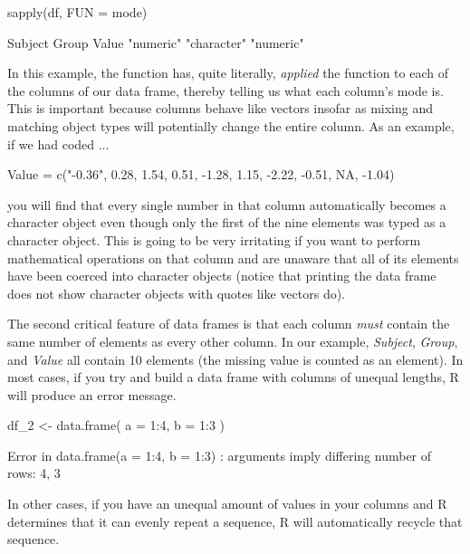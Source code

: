 \begin{inR}
sapply(df, FUN = mode) 
\end{inR}

\begin{outR}
     Subject       Group       Value 
  "numeric" "character"   "numeric"    
\end{outR}

In this example, the  function has, quite literally, \textit{applied} the function  to each of the columns of our data frame, thereby telling us what each column's mode is. This is important because columns behave like vectors insofar as mixing and matching object types will potentially change the entire column.  As an example, if we had coded ... 

\begin{inR}
Value = c("-0.36", 0.28, 1.54, 0.51, -1.28, 1.15, -2.22, -0.51, NA, -1.04)
\end{inR}

\vspace{1em}

\noindent
you will find that every single number in that column automatically becomes a character object even though only the first of the nine elements was typed as a character object. This is going to be very irritating if you want to perform mathematical operations on that column and are unaware that all of its elements have been coerced into character objects (notice that printing the data frame does not show character objects with quotes like vectors do).

The second critical feature of data frames is that each column \textit{must} contain the same number of elements as every other column.  In our example, \textit{Subject}, \textit{Group}, and \textit{Value} all contain 10 elements (the missing value is counted as an element).  In most cases, if you try and build a data frame with columns of unequal lengths, R will produce an error message. 

\begin{inR}
df_2 <- data.frame(
  a = 1:4,
  b = 1:3
)
\end{inR}
\begin{outR}
Error in data.frame(a = 1:4, b = 1:3) : 
  arguments imply differing number of rows: 4, 3
\end{outR}

\noindent
In other cases, if you have an unequal amount of values in your columns and R determines that it can evenly repeat a sequence, R will automatically recycle that sequence.

